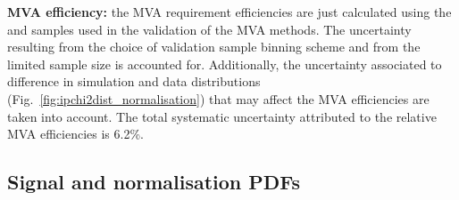 \begin{description}
\item \textbf{MVA efficiency:} %
the MVA requirement efficiencies are just calculated using the \decay{\Bs}{\jpsi\phiz} and \decay{\Bsb}{\Dsp\pim} samples used in the validation of the MVA methods. The uncertainty resulting from the choice of validation sample binning scheme and from the limited sample size is accounted for. 
Additionally, the uncertainty associated to difference in simulation and data distributions (Fig.~\ref{fig:ipchi2dist_normalisation}) that may affect the MVA efficiencies are taken into account. 
The total systematic uncertainty attributed to the relative MVA efficiencies is 6.2\%.
\end{description}

\subsection{Signal and normalisation PDFs}


